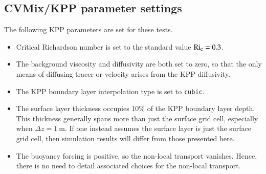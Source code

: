 \begin{table}[h!t]
\caption{
  Surface boundary heat flux formulations for the three test cases.  
  The third test considers a restoring boundary condition
  for the top model grid cell, with restoring temperature given by  
  $\Theta_{\mbox{\footnotesize restore}} 
  = \Theta_s + 10^{\circ}C$, and the piston velocity set to 
  $w_{\mbox{\footnotesize piston}} = 0.5~\mbox{m}~\mbox{day}^{-1}$.}
\label{table:kpp-test-case-WSwPSBF}
\end{table}


\subsection{CVMix/KPP parameter settings}

The following KPP parameters are set for these tests. 
\begin{itemize}

\item Critical Richardson number is set to the standard value $\mbox{Ri}_{\mbox{\footnotesize c}} = 0.3$.

\item The background viscosity and diffusivity are both set to zero,
  so that the only means of diffusing tracer or velocity arises from
  the KPP diffusivity.

\item The KPP boundary layer interpolation type is set to {\tt cubic}.

\item The surface layer thickness occupies 10\% of the KPP boundary
  layer depth.  This thickness generally spans more than just the
  surface grid cell, especially when $\Delta z = 1~\mbox{m}$.  If one
  instead assumes the surface layer is just the surface grid cell,
  then simulation results will differ from those presented here.

\item The buoyancy forcing is positive, so the non-local transport
  vanishes.  Hence, there is no need to detail associated choices for
  the non-local transport.

\end{itemize}


